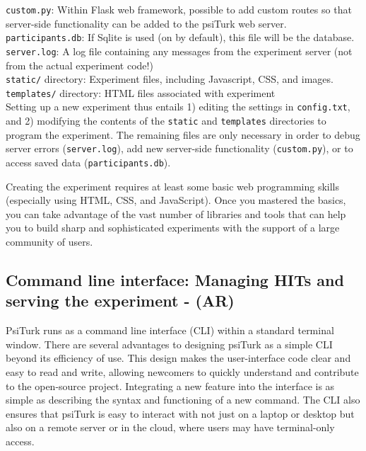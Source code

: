 \documentclass[twocolumn]{svjour3}          %
\begin{document}
\noindent \texttt{custom.py}: Within Flask web framework, possible to add custom routes so that server-side functionality can be added to the psiTurk web server. \\ 

\noindent \texttt{participants.db}: If Sqlite is used (on by default), this file will be the database. \\

\noindent \texttt{server.log}: A log file containing any messages from the experiment server (not from the actual experiment code!) \\ 

\noindent \texttt{static/} directory: Experiment files, including Javascript, CSS, and images. \\

\noindent \texttt{templates/} directory: HTML files associated with experiment \\


Setting up a new experiment thus entails 1) editing the settings in \texttt{config.txt}, and 2) modifying the contents of the \texttt{static} and \texttt{templates} directories to program the experiment.
The remaining files are only necessary in order to debug server errors (\texttt{server.log}), add new server-side functionality (\texttt{custom.py}), or to access saved data (\texttt{participants.db}).

Creating the experiment requires at least some basic web programming skills (especially using HTML, CSS, and JavaScript).
Once you mastered the basics, you can take advantage of the vast number of libraries and tools that can help you to build sharp and sophisticated experiments with the support of a large community of users.


\subsection{Command line interface: Managing HITs and serving the experiment - (AR)}

PsiTurk runs as a command line interface (CLI) within a standard terminal window.
There are several advantages to designing psiTurk as a simple CLI beyond its efficiency of use. This
design makes the user-interface code clear and easy to read and write, allowing newcomers to quickly
understand and contribute to the open-source project. Integrating a new feature into the interface
is as simple as describing the syntax and functioning of a new command. The CLI also ensures that
psiTurk is easy to interact with not just on a laptop or desktop but also on a remote server or in
the cloud, where users may have terminal-only access.
 
\end{document}
